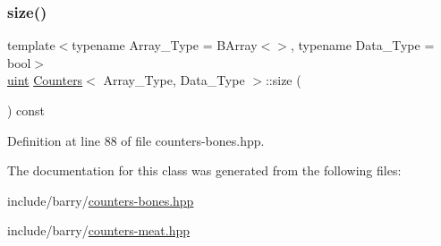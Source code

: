 \subsubsection{\texorpdfstring{size()}{size()}}
{\footnotesize\ttfamily template$<$typename Array\+\_\+\+Type = B\+Array$<$$>$, typename Data\+\_\+\+Type = bool$>$ \\
\hyperlink{typedefs_8hpp_a91ad9478d81a7aaf2593e8d9c3d06a14}{uint} \hyperlink{class_counters}{Counters}$<$ Array\+\_\+\+Type, Data\+\_\+\+Type $>$\+::size (\begin{DoxyParamCaption}{ }\end{DoxyParamCaption}) const\hspace{0.3cm}{\ttfamily [inline]}}



Definition at line 88 of file counters-\/bones.\+hpp.



The documentation for this class was generated from the following files\+:\begin{DoxyCompactItemize}
\item 
include/barry/\hyperlink{counters-bones_8hpp}{counters-\/bones.\+hpp}\item 
include/barry/\hyperlink{counters-meat_8hpp}{counters-\/meat.\+hpp}\end{DoxyCompactItemize}
